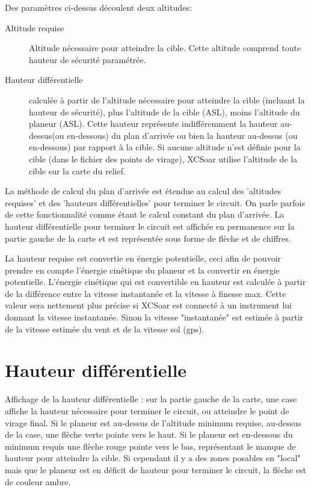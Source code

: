 Des paramètres ci-dessus découlent deux altitudes:
\begin{description}
\item[Altitude requise] Altitude nécessaire pour atteindre la cible. Cette altitude comprend toute hauteur de sécurité paramétrée.
\item[Hauteur différentielle] calculée à partir de l'altitude nécessaire pour atteindre la cible (incluant la hauteur de sécurité), plus l'altitude de la cible (ASL), moins l'altitude du planeur (ASL). Cette hauteur représente indifféremment la hauteur au-dessus(ou en-dessous) du plan d'arrivée ou bien  la hauteur au-dessus (ou en-dessous) par rapport à la cible. Si aucune altitude n'est définie pour la cible (dans le fichier des points de virage), XCSoar utilise l'altitude de la cible sur la carte du relief.
\end{description}

La méthode de calcul du plan d'arrivée est étendue au calcul des 'altitudes requises' et des 'hauteurs différentielles'  pour terminer le circuit. On parle parfois de cette fonctionnalité comme étant le calcul constant du plan d'arrivée. La hauteur différentielle pour terminer le circuit est affichée en permanence sur la partie gauche de la carte et est représentée sous forme de flèche et de chiffres. 

La hauteur requise est convertie en énergie potentielle, ceci afin de pouvoir prendre en compte l'énergie cinétique du planeur et la convertir en énergie potentielle. L'énergie cinétique qui est convertible en hauteur est calculée à partir de la différence entre la vitesse instantanée et la vitesse à finesse max. Cette valeur sera nettement plus précise si XCSoar est connecté à un instrument lui donnant la vitesse instantanée. Sinon la vitesse "instantanée" est estimée à partir de la vitesse estimée du vent et de la vitesse sol (gps). 

\section{Hauteur différentielle}

Affichage de la hauteur différentielle : sur la partie gauche de la carte, une case affiche la hauteur nécessaire pour terminer le circuit, ou atteindre le point de virage final. Si le planeur est au-dessus de l'altitude minimum requise, au-dessus de la case, une flèche verte pointe vers le haut. Si le planeur est en-dessous du minimum requis une flèche rouge pointe vers le bas, représentant le manque de hauteur pour atteindre la cible. Si cependant il y a des zones posables en "local" mais que le planeur est en déficit de hauteur pour terminer le circuit, la flèche est de couleur ambre.

